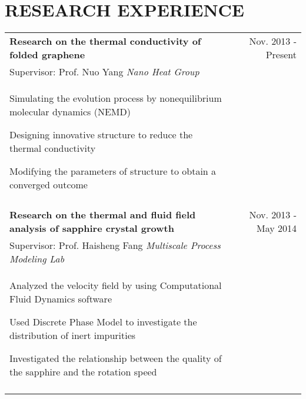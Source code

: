 \documentclass[a4paper,10pt]{article}
\begin{document}
\section{RESEARCH EXPERIENCE}
\begin{tabular}{p{14cm}r}
\textbf{Research on the thermal conductivity of folded graphene} & Nov. 2013 - Present \\
\hspace{1em} Supervisor: Prof. Nuo Yang \hspace{9em} \emph{Nano Heat Group} & \vspace{-0.5em}\\
\begin{compactitem}
       \item Simulating the evolution process by nonequilibrium molecular dynamics (NEMD)\vspace{0.2em}
       \item Designing innovative structure to reduce the thermal conductivity\vspace{0.2em}
       \item Modifying the parameters of structure to obtain a converged outcome
     \end{compactitem}&\vspace{-2.2em} \\
\multicolumn{2}{c}{} \\
\textbf{Research on the thermal and fluid field analysis of sapphire crystal growth}  &Nov. 2013 - May 2014 \\
\hspace{1em} Supervisor: Prof. Haisheng Fang \hspace{6em} \emph{Multiscale Process Modeling Lab}  & \vspace{-0.5em} \\
\begin{compactitem}
       \item Analyzed the velocity field by using Computational Fluid Dynamics software\vspace{0.2em}
       \item Used Discrete Phase Model to investigate the distribution of inert impurities\vspace{0.2em}
       \item Investigated the relationship between the quality of the sapphire and the rotation speed
     \end{compactitem}&\vspace{-2.2em} \\
\multicolumn{2}{c}{} \\

\end{tabular}
\end{document}
